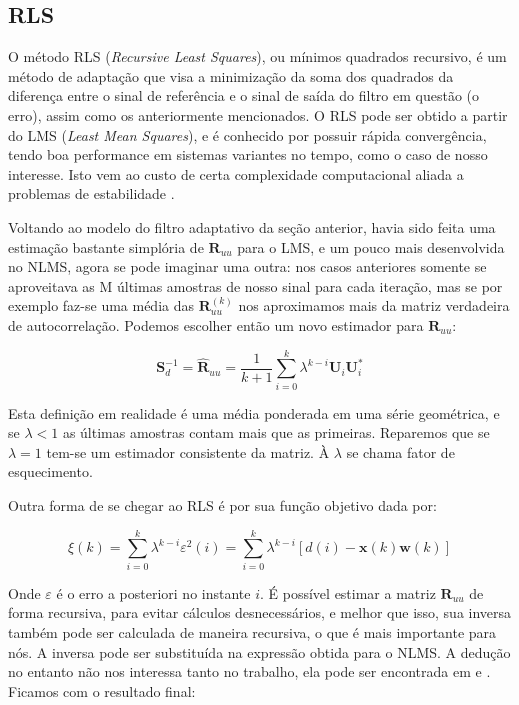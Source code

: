 \subsection{RLS}

\indent O método RLS (\textit{Recursive Least Squares}), ou mínimos quadrados recursivo, é um método de adaptação que visa a minimização da soma dos quadrados da diferença entre o sinal de referência e o sinal de saída do filtro em questão (o erro), assim como os anteriormente mencionados. O RLS pode ser obtido a partir do LMS (\textit{Least Mean Squares}), e é conhecido por possuir rápida convergência, tendo boa performance em sistemas variantes no tempo, como o caso de nosso interesse. Isto vem ao custo de certa complexidade computacional aliada a problemas de estabilidade \cite{diniz1997adaptive}.

\indent Voltando ao modelo do filtro adaptativo da seção anterior, havia sido feita uma estimação bastante simplória de $\boldsymbol{R}_{uu}$ para o LMS, e um pouco mais desenvolvida no NLMS, agora se pode imaginar uma outra: nos casos anteriores somente se aproveitava as M últimas amostras de nosso sinal para cada iteração, mas se por exemplo faz-se uma média das $\boldsymbol{R}_{uu}^{(k)}$ nos aproximamos mais da matriz verdadeira de autocorrelação. Podemos escolher então um novo estimador para $\boldsymbol{R}_{uu}$:

\begin{equation}
\boldsymbol{S}_{d}^{-1}=\boldsymbol{\hat{R}}_{uu}=\frac{1}{k+1}\sum_{i=0}^{k}\lambda^{k-i}\boldsymbol{U}_i\boldsymbol{U}_i^*
\end{equation}

\indent Esta definição em realidade é uma média ponderada em uma série geométrica, e se $\lambda<1$ as últimas amostras contam mais que as primeiras. Reparemos que se $\lambda=1$ tem-se um estimador consistente da matriz. À $\lambda$ se chama fator de esquecimento.


\indent Outra forma de se chegar ao RLS é por sua função objetivo dada por:

\begin{equation}
\xi(k)=\sum_{i=0}^{k}\lambda^{k-i}\varepsilon^2(i)
=\sum_{i=0}^{k}\lambda^{k-i}[d(i)-\boldsymbol{x}(k) \boldsymbol{w}(k)]
\end{equation}

\indent Onde $\varepsilon$ é o erro a posteriori no instante $i$. É possível estimar a matriz $\boldsymbol{R}_{uu}$ de forma recursiva, para evitar cálculos desnecessários, e melhor que isso, sua inversa também pode ser calculada de maneira recursiva, o que é mais importante para nós. A inversa pode ser substituída na expressão obtida para o NLMS. A dedução no entanto não nos interessa tanto no trabalho, ela pode ser encontrada em \cite{haykin2005adaptive} e \cite{diniz1997adaptive}. Ficamos com o resultado final:

